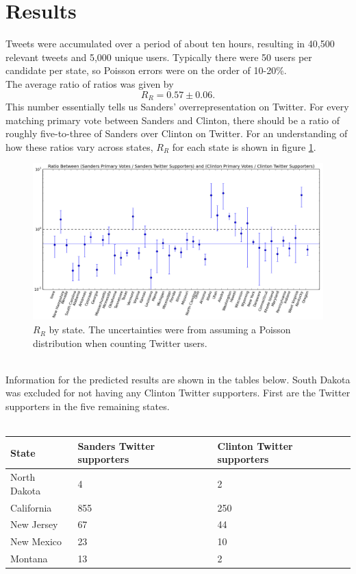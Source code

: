 \documentclass[12pt]{extarticle}
\begin{document}
\section{Results}
Tweets were accumulated over a period of about ten hours, resulting in 40,500 relevant tweets and 5,000 unique users.
Typically there were 50 users per candidate per state, so Poisson errors were on the order of 10-20\%.
\\
\indent
The average ratio of ratios was given by
\begin{equation}
R_R = 0.57 \pm 0.06.
\end{equation}
This number essentially tells us Sanders' overrepresentation on Twitter.
For every matching primary vote between Sanders and Clinton, there should be a ratio of roughly five-to-three of Sanders over Clinton on Twitter.
For an understanding of how these ratios vary across states, $R_R$ for each state is shown in figure \ref{fig:rr}.
\begin{figure}
\centering
\includegraphics[width=\linewidth]{ratio_ratios.png}
\caption{$R_R$ by state. The uncertainties were from assuming a Poisson distribution when counting Twitter users.}
\label{fig:rr}
\end{figure}
\\
\indent
Information for the predicted results are shown in the tables below.
South Dakota was excluded for not having any Clinton Twitter supporters.
First are the Twitter supporters in the five remaining states.
\\
\\
\begin{centering}
  \begin{tabular}{|l|l|l|}
	  \hline
     State & Sanders Twitter supporters & Clinton Twitter supporters \\
	  \hline
	  \hline
     North Dakota & 4 & 2 \\
     California & 855 & 250 \\
     New Jersey & 67 & 44 \\
     New Mexico & 23 & 10 \\
     Montana & 13 & 2 \\
	  \hline
  \end{tabular}
\end{centering}
\\
\\
\end{document}
